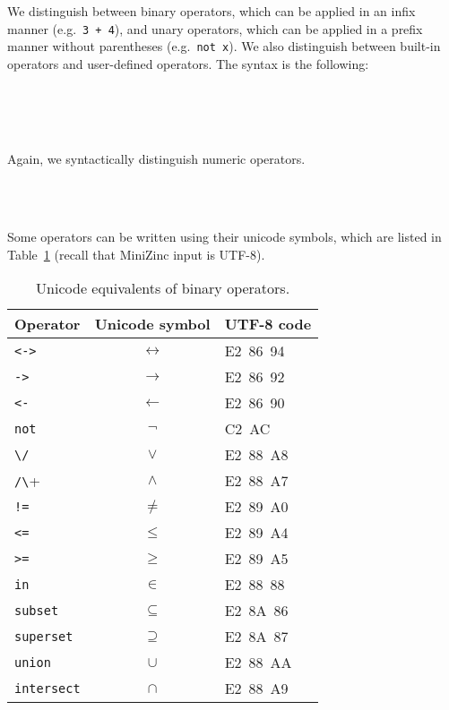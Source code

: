 \documentclass[10pt]{scrartcl}
\newcommand{\pjs}[1]{\textcolor{blue}{PJS:#1}}
\begin{document}
We distinguish between binary operators, which can be applied in an infix
manner (e.g.~\texttt{3 + 4}), and unary operators, which can be applied in a
prefix manner without parentheses (e.g.~\texttt{not x}).  We also
distinguish between built-in operators and user-defined operators.  The
syntax is the following:
\begin{productions}
    \RuleBuiltinOp \\
    \RuleBinOp \\
    \RuleBuiltinBinOp \\
    \RuleBuiltinUnOp
\end{productions}

Again, we syntactically distinguish numeric operators.
\begin{productions}
    \RuleNumBinOp \\
    \RuleBuiltinNumBinOp \\
    \RuleBuiltinNumUnOp
\end{productions}

Some operators can be written using their unicode symbols, which are listed in Table~\ref{bin-ops-unicode} (recall that MiniZinc input is UTF-8).

\begin{table}[t]
\centering
\begin{tabular}{lcl}
  \hline
  Operator              & Unicode symbol & UTF-8 code \\
  \hline
  \texttt{<->}          & $\leftrightarrow$ & E2~86~94\\
  \texttt{->}           & $\rightarrow$ & E2~86~92\\
  \texttt{<-}           & $\leftarrow$ & E2~86~90\\
  \texttt{not}          & $\lnot$ & C2~AC\\
  \verb+\/+          & $\lor$ & E2~88~A8\\
  \verb+/\+          & $\land$ & E2~88~A7\\
  \texttt{!=}  & $\neq$ & E2~89~A0\\
  \texttt{<=}  & $\leq$ & E2~89~A4\\
  \texttt{>=}  & $\geq$ & E2~89~A5\\
  \texttt{in}        & $\in$ & E2~88~88\\
  \texttt{subset}    & $\subseteq$ & E2~8A~86\\
  \texttt{superset}  & $\supseteq$ & E2~8A~87\\
  \texttt{union}     & $\cup$ & E2~88~AA\\
  \texttt{intersect} & $\cap$ & E2~88~A9\\
  
\end{tabular}
\caption{Unicode equivalents of binary operators.}
\label{bin-ops-unicode}
\end{table}
\end{document}
